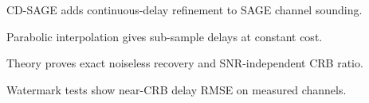 \begin{highlights}
\item CD-SAGE adds continuous-delay refinement to SAGE channel sounding.
\item Parabolic interpolation gives sub-sample delays at constant cost.
\item Theory proves exact noiseless recovery and SNR-independent CRB ratio.
\item Watermark tests show near-CRB delay RMSE on measured channels.
\end{highlights}